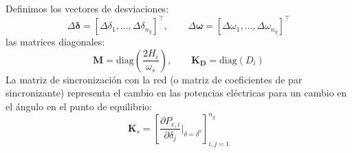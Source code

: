 \documentclass{beamer}
\begin{document}
\begin{frame}
Definimos los vectores de desviaciones: 
\begin{equation}
    \Delta\boldsymbol{\delta} = [\Delta\delta_1, \ldots, \Delta\delta_{n_g}]^\top, \qquad
    \Delta\boldsymbol{\omega} = [\Delta\omega_1, \ldots, \Delta\omega_{n_g}]^\top
\end{equation}
 las matrices diagonales:
 \begin{equation}
    \mathbf{M} = \mathrm{diag}\left(\frac{2H_i}{\omega_s}\right), \qquad
    \mathbf{K_D} = \mathrm{diag}(D_i)
 \end{equation}
 La matriz de sincronización con la red (o matriz de coeficientes de par sincronizante) representa el cambio en las potencias eléctricas para un cambio en el ángulo en el punto de equilibrio: 
\begin{equation}
    \mathbf{K}_s = \left[\frac{\partial P_{e,i}}{\partial \delta_j}\big|_{\delta = \delta^0}\right]_{i,j=1}^{n_g}
\end{equation}

\end{frame}
\end{document}
